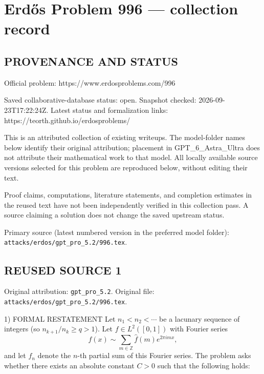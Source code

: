 \section*{Erd\H{o}s Problem 996 --- collection record}

\subsection*{PROVENANCE AND STATUS}
Official problem: https://www.erdosproblems.com/996

Saved collaborative-database status: open.
Snapshot checked: 2026-09-23T17:22:24Z.
Latest status and formalization links: https://teorth.github.io/erdosproblems/

This is an attributed collection of existing writeups. The model-folder names below identify their original attribution; placement in GPT\_6\_Astra\_Ultra does not attribute their mathematical work to that model. All locally available source versions selected for this problem are reproduced below, without editing their text.

Proof claims, computations, literature statements, and completion estimates in the reused text have not been independently verified in this collection pass. A source claiming a solution does not change the saved upstream status.

Primary source (latest numbered version in the preferred model folder): \texttt{attacks/erdos/gpt\_pro\_5.2/996.tex}.

\subsection*{REUSED SOURCE 1}
Original attribution: \texttt{gpt\_pro\_5.2}.
Original file: \texttt{attacks/erdos/gpt\_pro\_5.2/996.tex}.


1) FORMAL RESTATEMENT
Let $n_1<n_2<\cdots$ be a lacunary sequence of integers (so $n_{k+1}/n_k\ge q>1$).  Let $f\in L^2([0,1])$ with Fourier series
\[
 f(x)\sim \sum_{m\in\mathbb{Z}} \widehat f(m)e^{2\pi i m x},
\]
and let $f_n$ denote the $n$-th partial sum of this Fourier series.  The problem asks whether there exists an absolute constant $C>0$ such that the following holds:

